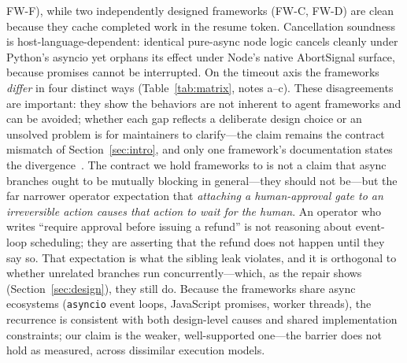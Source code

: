 \documentclass[10pt,journal,compsoc]{IEEEtran}
\begin{document}
\textsf{FW-F}), while two independently designed frameworks (\textsf{FW-C},
\textsf{FW-D}) are clean because they cache completed work in the resume
token. Cancellation soundness is host-language-dependent: identical pure-async
node logic cancels cleanly under Python's asyncio yet orphans its effect under
Node's native \textsf{AbortSignal} surface, because promises cannot be
interrupted. On the timeout axis the frameworks \emph{differ} in four distinct
ways (Table~\ref{tab:matrix}, notes a--c). These disagreements are important:
they show the behaviors are not inherent to agent frameworks and can be
avoided; whether each gap reflects a deliberate design choice or an unsolved
problem is for maintainers to clarify---the claim remains the contract
mismatch of Section~\ref{sec:intro}, and only one framework's documentation
states the divergence~\cite{lgdocs26}. The contract
we hold frameworks to is not a claim that async branches ought to be
mutually blocking in general---they should not be---but the far narrower
operator expectation that \emph{attaching a human-approval gate to an
irreversible action causes that action to wait for the human}. An operator
who writes ``require approval before issuing a refund'' is not reasoning
about event-loop scheduling; they are asserting that the refund does not
happen until they say so. That expectation is what the sibling leak
violates, and it is orthogonal to whether unrelated branches run
concurrently---which, as the repair shows (Section~\ref{sec:design}), they
still do. Because the frameworks share async
ecosystems (\texttt{asyncio} event loops, JavaScript promises, worker
threads), the recurrence is consistent with both design-level causes and
shared implementation constraints; our claim is the weaker, well-supported
one---the barrier does not hold as measured, across dissimilar execution
models.
\end{document}
